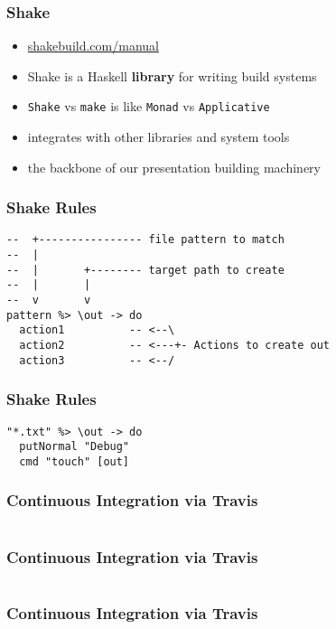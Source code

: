 \documentclass{beamer}
\begin{document}
\begin{frame}
  \frametitle{Shake}
  \begin{itemize}
  \item \url{shakebuild.com/manual}
  \item Shake is a Haskell \textbf{library} for writing build systems
  \item \texttt{Shake} vs \texttt{make} is like \texttt{Monad} vs \texttt{Applicative}
  \item integrates with other libraries and system tools
  \item the backbone of our presentation building machinery
  \end{itemize}
\end{frame}

\begin{frame}[fragile]
  \frametitle{Shake Rules}
  \begin{verbatim}
--  +---------------- file pattern to match
--  |
--  |       +-------- target path to create
--  |       |
--  v       v
pattern %> \out -> do
  action1          -- <--\
  action2          -- <---+- Actions to create out
  action3          -- <--/
  \end{verbatim}
\end{frame}

\begin{frame}[fragile]
  \frametitle{Shake Rules}
  \begin{verbatim}
"*.txt" %> \out -> do
  putNormal "Debug"
  cmd "touch" [out]
  \end{verbatim}
\end{frame}

\begin{frame}
  \frametitle{Continuous Integration via Travis}
  \inputminted[linenos=false, fontsize=\tiny, lastline=31]{yaml}{static-source/long-travis-ci.yml}
\end{frame}

\begin{frame}
  \frametitle{Continuous Integration via Travis}
  \inputminted[linenos=false, fontsize=\tiny, firstline=31, lastline=60]{yaml}{static-source/long-travis-ci.yml}
\end{frame}

\begin{frame}
  \frametitle{Continuous Integration via Travis}
  \inputminted[linenos=false, fontsize=\tiny, firstline=61, lastline=90]{yaml}{static-source/long-travis-ci.yml}
\end{frame}
\end{document}
